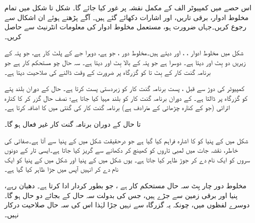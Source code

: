اس حصے میں  کمپیوٹر  الف کے مکمل نقشہ  پر غور کیا جائے گا۔ شکل    تا شکل   میں تمام مخلوط ادوار، برقی تاریں، اور اشارات دکھائے گئے ہیں۔ آگے پڑھتے ہوئے ان  اشکال سے رجوع کریں۔جہاں ضرورت ہو، مستعمل  مخلوط ادوار  کی معلومات انٹرنیٹ سے حاصل کریں۔

شکل  میں مخلوط ادوار ، ، اور   دیتے ہیں۔مخلوط دور    ، جو  ہے، دوہرا جے کے پلٹ کار ہے، جو پتہ کے  زیریں دو بِٹ  اور  دیتا ہے۔  دوسرا   ہے جو پتہ کے بالا بِٹ  اور  دیتا ہے۔     سہ حال چو   مستحکم کار ہے جو برنامہ گنت کار  کے بِٹ  تا  کو  گزرگاہ پر ضرورت کے وقت ڈالنے کی صلاحیت دیتا ہے۔

کمپیوٹر کی دوڑ سے قبل ، پست  برنامہ گنت کار کو  زبردستی پست   کرتا ہے۔  حال کے دوران بلند  پتے کو  گزرگاہ پر ڈالتا ہے۔    کے دوران  برنامہ گنت کار کو بلند  مہیا کیا جاتا ہے؛  نصف حال گزر کر  کا  کنارہ اترائی (جو  کے کنارہ چڑھائی کے مترادف ہے) برنامہ گنت کار  کی گنتی میں  کا اضافہ کرتا ہے۔

  تا  حال کے دوران برنامہ گنت کار  غیر فعال ہو گا۔
 
 شکل  میں   کے پنیا   کو  کا اشارہ فراہم کیا گیا ہے جو  درحقیقت شکل  میں   کے پنیا  سے آتا ہے۔صفائی کی خاطر،  نقشہ جات میں لمبی تاروں کو کھینچ کر دکھانے سے گریز کیا جاتا ہے۔ایسی تار کے دونوں سروں کو ایک نام دے کر جوڑ ظاہر کیا جاتا ہے۔ یوں   شکل  میں   کے پنیا   اور   شکل  میں   کے پنیا  کو ایک نام  دے کر  انہیں آپس میں جڑا ظاہر کیا گیا ہے۔
 
 مخلوط دور      چار بِٹ   سہ حال  مستحکم کار ہے ، جو  بطور   کردار ادا کرتا ہے۔ دھیان  رہے، پنیا  اور   برقی زمین سے جڑے ہیں، جس کی بدولت  سہ حال کے بجائے دو حال ہو گا۔ دوسرے  لفظوں میں، چونکہ یہ گزرگاہ سے نہیں جڑا لہٰذا  اس کی سہ حال صلاحیت درکار نہیں۔
 
